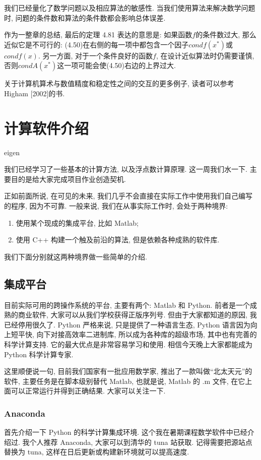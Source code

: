 \documentclass[a4paper]{ctexart}
\begin{document}
我们已经量化了数学问题以及相应算法的敏感性. 当我们使用算法来解决数学问题时, 
问题的条件数和算法的条件数都会影响总体误差. 

作为一整章的总结, 最后的定理 4.81 表达的意思是: 如果函数$f$的条件数过大, 那么近似它是不可行的: 
(4.50)在右侧的每一项中都包含一个因子$condf(x^*)$或$condf(x)$. 另一方面, 
对于一个条件良好的函数$f$, 在设计近似算法时仍需要谨慎, 否则$condA(x^*)$这一项可能会使(4.50)右边的上界过大.

关于计算机算术与数值精度和稳定性之间的交互的更多例子, 读者可以参考Higham [2002]的书.


\section*{计算软件介绍}

eigen

我们已经学习了一些基本的计算方法, 以及浮点数计算原理. 这一周我们水一下.
主要目的是给大家完成项目作业创造契机.

正如前面所说, 在可见的未来, 我们几乎不会直接在实际工作中使用我们自己编写的程序,
因为不可靠. 一般来说, 我们在从事实际工作时, 会处于两种境界:

\begin{enumerate}
\item 使用某个现成的集成平台, 比如 Matlab;
\item 使用 C++ 构建一个触及前沿的算法, 但是依赖各种成熟的软件库.
\end{enumerate}

我们下面分别就这两种境界做一些简单的介绍.

\subsection*{集成平台}
目前实际可用的跨操作系统的平台, 主要有两个: Matlab 和 Python. 前者是一个成熟的商业软件,
大家可以从我们学校获得正版序列号. 但由于大家都知道的原因, 我已经停用很久了. Python 严格来说,
只是提供了一种语言生态, Python 语言因为向上短平快, 向下对接高效率二进制库,
所以成为各种库的超级市场, 其中也有完善的科学计算支持. 它的最大优点是非常容易学习和使用.
相信今天晚上大家都能成为 Python 科学计算专家.

这里顺便说一句, 目前我们国家有一批应用数学家, 推出了一款叫做``北太天元''的软件,
主要任务是在脚本级别替代 Matlab, 也就是说, Matlab 的 .m 文件, 在它上面可以正常运行并得到正确结果.
大家可以关注一下.

\subsubsection*{Anaconda}
首先介绍一下 Python 的科学计算集成环境. 这个我在暑期课程数学软件中已经介绍过. 我个人推荐
Anaconda, 大家可以到清华的 tuna 站获取. 记得需要把源站点替换为 tuna,
这样在日后更新或构建新环境就可以提高速度.
\end{document}
